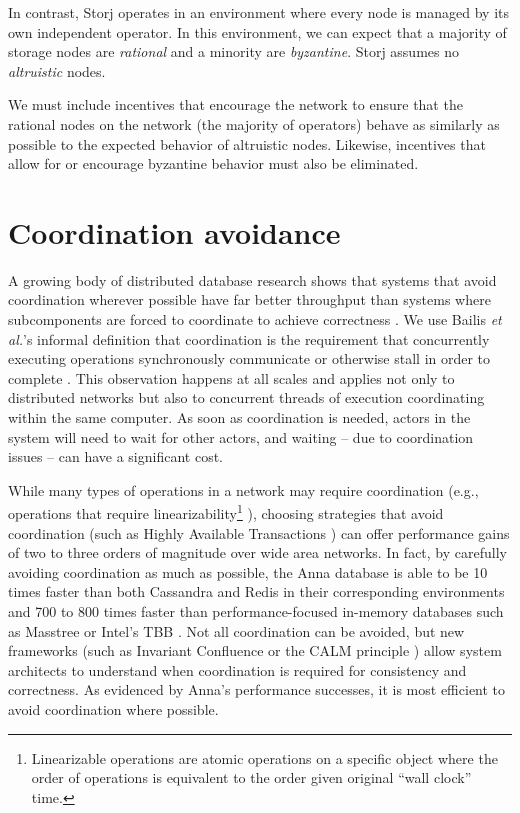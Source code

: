 \documentclass[8pt,fleqn,openany]{book}
\begin{document}
In contrast, Storj operates in an environment where every node is
managed by its own independent operator.
In this environment, we can expect that a majority
of storage nodes are {\em rational} and a minority are {\em byzantine}. Storj assumes no
{\em altruistic} nodes.

We must include incentives that encourage the network to ensure that the
rational nodes on the network (the majority of operators) behave as similarly
as possible to the expected behavior of altruistic nodes.
Likewise, incentives that allow for or encourage byzantine behavior must also
be eliminated.

\section{Coordination avoidance}\label{sec:coordination-avoidance}

A growing body of distributed database research shows that systems that
avoid coordination wherever possible have far better throughput than systems
where subcomponents are forced to coordinate to achieve correctness
\cite{cap1, cap2, consistency-vs-latency, hat, i-confluence, anna,
calm1, calm2}.
We use Bailis {\em et al.}'s informal definition
that coordination is the requirement that concurrently executing operations
synchronously communicate or otherwise stall in order to complete
\cite{i-confluence}.
This observation happens at all scales and applies not only to distributed
networks but also to
concurrent threads of execution coordinating within the same computer.
As soon as coordination is needed, actors in the system will need to wait for
other actors, and waiting -- due to coordination issues -- can have a significant
cost.

While many types of operations in a network may require coordination
(e.g., operations that require linearizability\footnote{
Linearizable operations are atomic operations on a specific object where
the order of operations is equivalent to the order given original ``wall clock''
time.
}
\cite{jepsen-consistency, hat, vv-consistency}), choosing strategies that
avoid coordination (such as Highly Available Transactions \cite{hat}) can offer
performance gains of two to three orders of magnitude over wide area networks.
In fact, by carefully avoiding coordination as much as possible, the Anna
database is able to be 10 times faster than both Cassandra and Redis in their
corresponding environments and 700 to 800 times faster than
performance-focused in-memory databases such as Masstree or Intel's TBB
\cite{anna, anna-announce}.
Not all coordination can be avoided, but new frameworks (such as Invariant
Confluence \cite{i-confluence} or the CALM principle \cite{calm1, calm2})
allow system architects to understand when coordination is required for
consistency and correctness. As evidenced
by Anna's performance successes, it is most efficient to avoid coordination
where possible.
\end{document}
